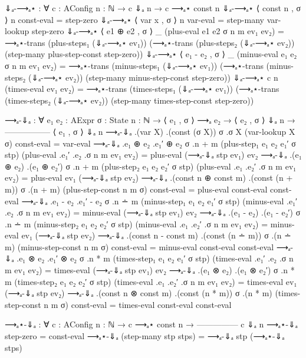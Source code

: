 \documentclass{lecturenotes}
\begin{document}
\begin{code}[hide]
⇓ₐ-⟶ₐ⋆ : ∀ {c : AConfig} {n : ℕ} → c ⇓ₐ n → c ⟶ₐ⋆ const n
⇓ₐ-⟶ₐ⋆ {⟨ const n , σ ⟩} {n} const-eval = step-zero
⇓ₐ-⟶ₐ⋆ {⟨ var x , σ ⟩} {n} var-eval = step-many var-lookup step-zero
⇓ₐ-⟶ₐ⋆ {⟨ e1 ⊕ e2 , σ ⟩} {_} (plus-eval {e1} {e2} {σ} {n} {m} ev₁ ev₂) =
  ⟶ₐ⋆-trans (plus-steps₁ (⇓ₐ-⟶ₐ⋆ ev₁))
 (⟶ₐ⋆-trans (plus-steps₂ (⇓ₐ-⟶ₐ⋆ ev₂))
            (step-many plus-step-const step-zero))
⇓ₐ-⟶ₐ⋆ {⟨ e₁ - e₂ , σ ⟩} {_} (minus-eval {e₁} {e₂} {σ} {n} {m} ev₁ ev₂) =
  ⟶ₐ⋆-trans (minus-steps₁ (⇓ₐ-⟶ₐ⋆ ev₁))
 (⟶ₐ⋆-trans (minus-steps₂ (⇓ₐ-⟶ₐ⋆ ev₂))
            (step-many minus-step-const step-zero))
⇓ₐ-⟶ₐ⋆ {c} {n} (times-eval ev₁ ev₂) = 
  ⟶ₐ⋆-trans (times-steps₁ (⇓ₐ-⟶ₐ⋆ ev₁))
 (⟶ₐ⋆-trans (times-steps₂ (⇓ₐ-⟶ₐ⋆ ev₂))
            (step-many times-step-const step-zero))

⟶ₐ-⇓ₐ : ∀ {e₁ e₂ : AExpr} {σ : State} {n : ℕ} →
   ⟨ e₁ , σ ⟩ ⟶ₐ e₂ →
   ⟨ e₂ , σ ⟩ ⇓ₐ n →
  -----------------
   ⟨ e₁ , σ ⟩ ⇓ₐ n
⟶ₐ-⇓ₐ {.(var X)} {.(const (σ X))} {σ} .{σ X} (var-lookup {X} {σ}) const-eval = var-eval
⟶ₐ-⇓ₐ .{e₁ ⊕ e₂} .{e₁′ ⊕ e₂} {σ} .{n + m} (plus-step₁ {e₁} {e₂} {e₁′} {σ} stp) (plus-eval .{e₁′} .{e₂} .{σ} {n} {m} ev₁ ev₂) = plus-eval (⟶ₐ-⇓ₐ stp ev₁) ev₂
⟶ₐ-⇓ₐ {.(e₁ ⊕ e₂)} {.(e₁ ⊕ e₂′)} {σ} .{n + m} (plus-step₂ {e₁} {e₂} {e₂′} {σ} stp) (plus-eval .{e₁} .{e₂′} .{σ} {n} {m} ev₁ ev₂) = plus-eval ev₁ (⟶ₐ-⇓ₐ stp ev₂)
⟶ₐ-⇓ₐ {.(const n ⊕ const m)} {.(const (n + m))} {σ} {.(n + m)} (plus-step-const {n} {m} {σ}) const-eval = plus-eval const-eval const-eval
⟶ₐ-⇓ₐ .{e₁ - e₂} .{e₁′ - e₂} {σ} .{n ∸ m} (minus-step₁ {e₁} {e₂} {e₁′} {σ} stp) (minus-eval .{e₁′} .{e₂} .{σ} {n} {m} ev₁ ev₂) = minus-eval (⟶ₐ-⇓ₐ stp ev₁) ev₂
⟶ₐ-⇓ₐ {.(e₁ - e₂)} {.(e₁ - e₂′)} {σ} .{n ∸ m} (minus-step₂ {e₁} {e₂} {e₂′} {σ} stp) (minus-eval .{e₁} .{e₂′} .{σ} {n} {m} ev₁ ev₂) = minus-eval ev₁ (⟶ₐ-⇓ₐ stp ev₂)
⟶ₐ-⇓ₐ {.(const n - const m)} {.(const (n ∸ m))} {σ} {.(n ∸ m)} (minus-step-const {n} {m} {σ}) const-eval = minus-eval const-eval const-eval
⟶ₐ-⇓ₐ .{e₁ ⊗ e₂} .{e₁′ ⊗ e₂} {σ} .{n * m} (times-step₁ {e₁} {e₂} {e₁′} {σ} stp) (times-eval .{e₁′} .{e₂} .{σ} {n} {m} ev₁ ev₂) = times-eval (⟶ₐ-⇓ₐ stp ev₁) ev₂
⟶ₐ-⇓ₐ {.(e₁ ⊗ e₂)} {.(e₁ ⊗ e₂′)} {σ} .{n * m} (times-step₂ {e₁} {e₂} {e₂′} {σ} stp) (times-eval .{e₁} .{e₂′} .{σ} {n} {m} ev₁ ev₂) = times-eval ev₁ (⟶ₐ-⇓ₐ stp ev₂)
⟶ₐ-⇓ₐ {.(const n ⊗ const m)} {.(const (n * m))} {σ} {.(n * m)} (times-step-const {n} {m} {σ}) const-eval = times-eval const-eval const-eval

⟶ₐ⋆-⇓ₐ : ∀ {c : AConfig} {n : ℕ} →
   c ⟶ₐ⋆ const n →
  ---------------
      c ⇓ₐ n
⟶ₐ⋆-⇓ₐ step-zero = const-eval
⟶ₐ⋆-⇓ₐ (step-many stp stps) = ⟶ₐ-⇓ₐ stp (⟶ₐ⋆-⇓ₐ stps)



\end{code}
\end{document}
